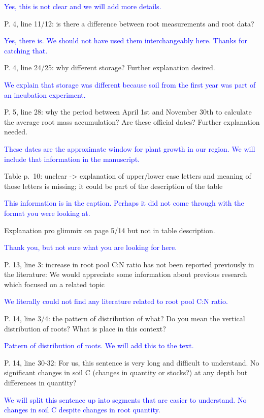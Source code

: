 \documentclass[]{article}
\begin{document}
\textcolor{blue}{Yes, this is not clear and we will add more details.}

P. 4, line 11/12: is there a difference between root measurements and
root data?

\textcolor{blue}{Yes, there is. We should not have used them interchangeably here. Thanks for catching that.}

P. 4, line 24/25: why different storage? Further explanation desired.

\textcolor{blue}{We explain that storage was different because soil from the first year was part of an incubation experiment.}

P. 5, line 28: why the period between April 1st and November 30th to
calculate the average root mass accumulation? Are these official dates?
Further explanation needed.

\textcolor{blue}{These dates are the approximate window for plant growth in our region. We will include that information in the manuscript.}

Table p.~10: unclear -\textgreater{} explanation of upper/lower case
letters and meaning of those letters is missing; it could be part of the
description of the table

\textcolor{blue}{This information is in the caption. Perhaps it did not come through with the format you were looking at.}

Explanation pro glimmix on page 5/14 but not in table description.

\textcolor{blue}{Thank you, but not sure what you are looking for here.}

P. 13, line 3: increase in root pool C:N ratio has not been reported
previously in the literature: We would appreciate some information about
previous research which focused on a related topic

\textcolor{blue}{We literally could not find any literature related to root pool C:N ratio.}

P. 14, line 3/4: the pattern of distribution of what? Do you mean the
vertical distribution of roots? What is place in this context?

\textcolor{blue}{Pattern of distribution of roots. We will add this to the text.}

P. 14, line 30-32: For us, this sentence is very long and difficult to
understand. No significant changes in soil C (changes in quantity or
stocks?) at any depth but differences in quantity?

\textcolor{blue}{We will split this sentence up into segments that are easier to understand. No changes in soil C despite changes in root quantity.}
\end{document}
